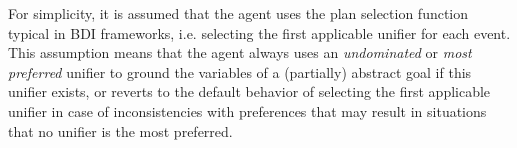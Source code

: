 






For simplicity, it is assumed that the agent uses the plan selection function typical in BDI frameworks, i.e. selecting the first applicable unifier for each event. This assumption means that the agent always uses an \textit{undominated} or \textit{most preferred} unifier to ground the variables of a (partially) abstract goal if this unifier exists, or reverts to the default behavior of selecting the first applicable unifier in case of inconsistencies with preferences that may result in situations that no unifier is the most preferred.




